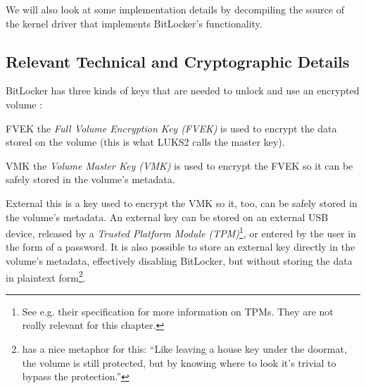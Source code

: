 We will also look at some implementation details by decompiling the source of the kernel driver that implements BitLocker's functionality.
%

\subsection{Relevant Technical and Cryptographic Details}
\label{chap:otherapproaches.bitlocker.details}
BitLocker has three kinds of keys that are needed to unlock and use an encrypted volume \cite{Kornblum2009}:
\begin{descitemize}
	\item[FVEK] the \emph{Full Volume Encryption Key (FVEK)} is used to encrypt the data stored on the volume (this is what LUKS2 calls the master key).
	\item[VMK] the \emph{Volume Master Key (VMK)} is used to encrypt the FVEK so it can be safely stored in the volume's metadata.
	\item[External] this is a key used to encrypt the VMK so it, too, can be safely stored in the volume's metadata. An external key can be stored on an external USB device, released by a \emph{Trusted Platform Module (TPM)}\footnote{\label{fn:otherapproaches.bitlocker.tpm} See e.g. their specification \cite{Tpm2019} for more information on TPMs. They are not really relevant for this chapter.}, or entered by the user in the form of a password. It is also possible to store an external key directly in the volume's metadata, effectively disabling BitLocker, but without storing the data in plaintext form\footnote{\label{fn:otherapproaches.bitlocker.doormat} \cite{Kornblum2009} has a nice metaphor for this: ``Like leaving a house key under the doormat, the volume is still protected, but by knowing where to look it's trivial to bypass the protection.''}.
\end{descitemize}

